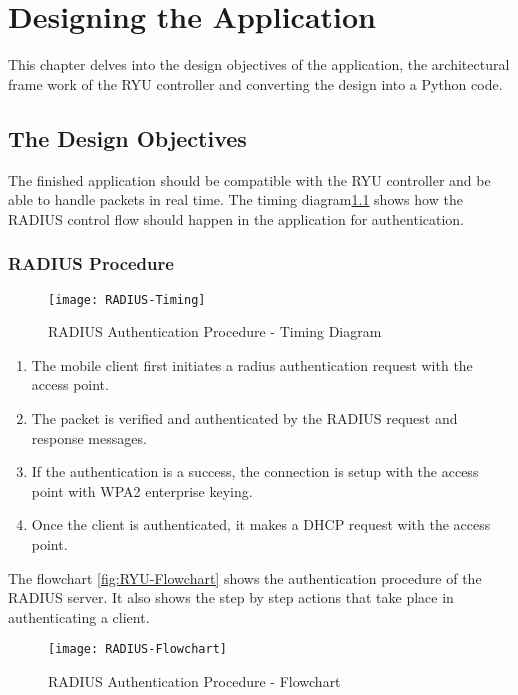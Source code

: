 \chapter{Designing the Application}\label{ch:application_design}
This chapter delves into the design objectives of the application, the architectural frame work of the RYU controller and converting the design into a Python code.

\section{The Design Objectives}

The finished application should be compatible with the RYU controller and be able to handle packets in real time. The timing diagram\ref{fig:Radius-Timing} shows how the RADIUS control flow should happen in the application for authentication.

\subsection{RADIUS Procedure} \label{RADIUS_Procedure}

\begin{figure}
	\centering
	\texttt{[image: RADIUS-Timing]}
	\caption {RADIUS Authentication Procedure - Timing Diagram }
	\label{fig:Radius-Timing}
	\vspace{-10pt}
\end{figure}

\begin{enumerate}
	\item The mobile client first initiates a radius authentication request with the access point.
	\item The packet is verified and authenticated by the RADIUS request and response messages.
	\item If the authentication is a success, the connection is setup with the access point with WPA2 enterprise keying.
	\item Once the client is authenticated, it makes a DHCP request with the access point.   
	
\end{enumerate}
The flowchart \ref{fig:RYU-Flowchart} shows the authentication procedure of the RADIUS server. It also shows the step by step actions that take place in authenticating a client.
\begin{figure}
	\centering
	\texttt{[image: RADIUS-Flowchart]}
	\caption {RADIUS Authentication Procedure - Flowchart }
	\label{fig:Radius-Flowchart}
	\vspace{-10pt}
\end{figure}
